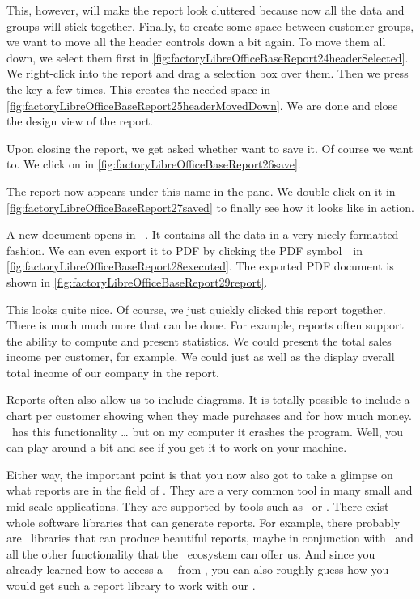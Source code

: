 This, however, will make the report look cluttered because now all the data and groups will stick together.
Finally, to create some space between customer groups, we want to move all the header controls down a bit again.
To move them all down, we select them first in \cref{fig:factoryLibreOfficeBaseReport24headerSelected}.
We right-click into the report and drag a selection box over them.
Then we press the \keys{\arrowkeydown} key a few times.
This creates the needed space in \cref{fig:factoryLibreOfficeBaseReport25headerMovedDown}.
We are done and close the design view of the report.

Upon closing the report, we get asked whether want to save it.
Of course we want to.
We click on  in \cref{fig:factoryLibreOfficeBaseReport26save}.

The report now appears under this name in the  pane.
We double-click on it in \cref{fig:factoryLibreOfficeBaseReport27saved} to finally see how it looks like in action.

A new document opens in \libreoffice\ .
It contains all the data in a very nicely formatted fashion.
We can even export it to PDF by clicking the PDF symbol~\libreOfficePdf\ in \cref{fig:factoryLibreOfficeBaseReport28executed}.
The exported PDF document is shown in \cref{fig:factoryLibreOfficeBaseReport29report}.

This looks quite nice.
Of course, we just quickly clicked this report together.
There is much much more that can be done.
For example, reports often support the ability to compute and present statistics.
We could present the total sales income per customer, for example.
We could just as well as the display overall total income of our company in the report.

Reports often also allow us to include diagrams.
It is totally possible to include a chart per customer showing when they made purchases and for how much money.
\libreofficeBase\ has this functionality {\dots} but on my computer it crashes the program.
Well, you can play around a bit and see if you get it to work on your machine.

Either way, the important point is that you now also got to take a glimpse on what reports are in the field of \dbs.
They are a very common tool in many small and mid-scale applications.
They are supported by tools such as \libreofficeBase\ or \microsoftAccess.
There exist whole software libraries that can generate reports.
For example, there probably are \python\ libraries that can produce beautiful reports, maybe in conjunction with \matplotlib\ and all the other functionality that the \python\ ecosystem can offer us.
And since you already learned how to access a \postgresql\ \db\ from \python, you can also roughly guess how you would get such a report library to work with our \db.%
%
\FloatBarrier%
\endhsection%
%
